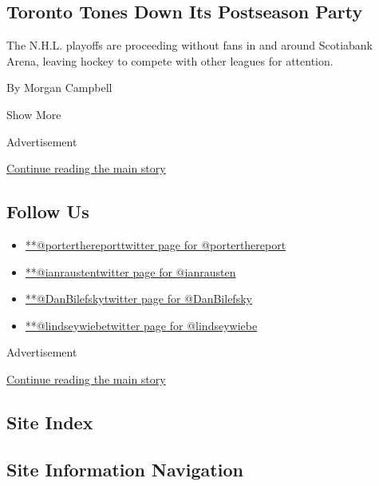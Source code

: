 \begin{enumerate}
  \hypertarget{toronto-tones-down-its-postseason-party}{%
  \subsection{Toronto Tones Down Its Postseason
  Party}\label{toronto-tones-down-its-postseason-party}}

  The N.H.L. playoffs are proceeding without fans in and around
  Scotiabank Arena, leaving hockey to compete with other leagues for
  attention.

  By Morgan Campbell
\end{enumerate}

Show More

Advertisement

\protect\hyperlink{after-mid1}{Continue reading the main story}

\hypertarget{follow-us}{%
\subsection{Follow Us}\label{follow-us}}

\begin{itemize}
\tightlist
\item
  \href{https://twitter.com/porterthereport}{**@porterthereporttwitter
  page for @porterthereport}
\item
  \href{https://twitter.com/ianrausten}{**@ianraustentwitter page for
  @ianrausten}
\item
  \href{https://twitter.com/DanBilefsky}{**@DanBilefskytwitter page for
  @DanBilefsky}
\item
  \href{https://twitter.com/lindseywiebe}{**@lindseywiebetwitter page
  for @lindseywiebe}
\end{itemize}

Advertisement

\protect\hyperlink{after-mktg}{Continue reading the main story}

\hypertarget{site-index}{%
\subsection{Site Index}\label{site-index}}

\hypertarget{site-information-navigation}{%
\subsection{Site Information
Navigation}\label{site-information-navigation}}

